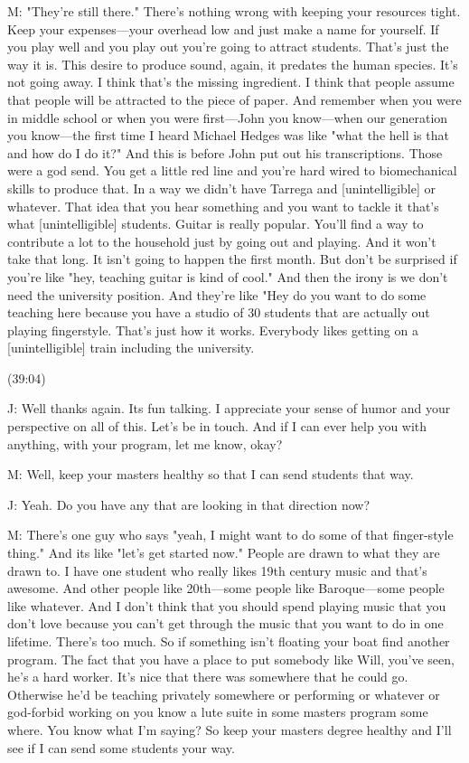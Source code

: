 \documentclass[11pt]{article}
\begin{document}
M: "They're still there." There's nothing wrong with keeping your resources tight. Keep your expenses—your overhead low and just make a name for yourself. If you play well and you play out you're going to attract students. That's just the way it is. This desire to produce sound, again, it predates the human species. It's not going away. I think that's the missing ingredient. I think that people assume that people will be attracted to the piece of paper. And remember when you were in middle school or when you were first—John you know—when our generation you know—the first time I heard Michael Hedges was like "what the hell is that and how do I do it?" And this is before John put out his transcriptions. Those were a god send. You get a little red line and you're hard wired to biomechanical skills to produce that. In a way we didn't have Tarrega and [unintelligible] or whatever. That idea that you hear something and you want to tackle it that's what [unintelligible] students. Guitar is really popular. You'll find a way to contribute a lot to the household just by going out and playing. And it won't take that long. It isn't going to happen the first month. But don't be surprised if you're like "hey, teaching guitar is kind of cool." And then the irony is we don't need the university position. And they're like "Hey do you want to do some teaching here because you have a studio of 30 students that are actually out playing fingerstyle. That's just how it works. Everybody likes getting on a [unintelligible] train including the university. 

(39:04)

J: Well thanks again. Its fun talking. I appreciate your sense of humor and your perspective on all of this. Let's be in touch. And if I can ever help you with anything, with your program, let me know, okay? 

M: Well, keep your masters healthy so that I can send students that way. 

J: Yeah. Do you have any that are looking in that direction now? 

M: There's one guy who says "yeah, I might want to do some of that finger-style thing." And its like "let's get started now." People are drawn to what they are drawn to. I have one student who really likes 19th century music and that's awesome. And other people like 20th—some people like Baroque—some people like whatever. And I don't think that you should spend playing music that you don't love because you can't get through the music that you want to do in one lifetime. There's too much. So if something isn't floating your boat find another program. The fact that you have a place to put somebody like Will, you've seen, he's a hard worker. It's nice that there was somewhere that he could go. Otherwise he'd be teaching privately somewhere or performing or whatever or god-forbid working on you know a lute suite in some masters program some where. You know what I'm saying? So keep your masters degree healthy and I'll see if I can send some students your way.
\end{document}
